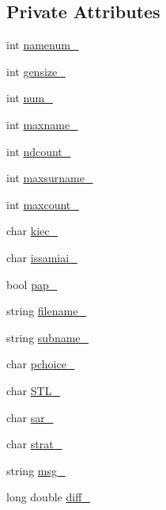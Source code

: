 \subsection*{Private Attributes}
\begin{DoxyCompactItemize}
\item 
int \mbox{\hyperlink{class_important_values_acd711f85f6a2871ae50aade637a51b2a}{namenum\+\_\+}}
\item 
int \mbox{\hyperlink{class_important_values_a49f72ee28d9dacb9d7bbf21271a01013}{gensize\+\_\+}}
\item 
int \mbox{\hyperlink{class_important_values_ae228106665e54c88007b1ff7284bcd40}{num\+\_\+}}
\item 
int \mbox{\hyperlink{class_important_values_ab7be93981115e171f8a37b15ec34fb08}{maxname\+\_\+}}
\item 
int \mbox{\hyperlink{class_important_values_ae86409afc0f217c84ec056c46ff3528e}{ndcount\+\_\+}}
\item 
int \mbox{\hyperlink{class_important_values_ad5e2235242b8c197dd8fd5dbf5c46b39}{maxsurname\+\_\+}}
\item 
int \mbox{\hyperlink{class_important_values_ae5892a115b336dc1defb0f62945f1bbb}{maxcount\+\_\+}}
\item 
char \mbox{\hyperlink{class_important_values_af1185fe18a6ffb86c4a7382f1f6749f4}{kiec\+\_\+}}
\item 
char \mbox{\hyperlink{class_important_values_a8b731b75de6085106d651d7450e65ae6}{issamiai\+\_\+}}
\item 
bool \mbox{\hyperlink{class_important_values_aedf041aae5dc23026b590f5eeb3f148a}{pap\+\_\+}}
\item 
string \mbox{\hyperlink{class_important_values_a178fdabdd685b94b2c2ff21e2ead73d5}{filename\+\_\+}}
\item 
string \mbox{\hyperlink{class_important_values_a993c7e0809f682a1172b11e04e5d35e8}{subname\+\_\+}}
\item 
char \mbox{\hyperlink{class_important_values_a0bcbd83830819fd57dc8481005985e59}{pchoice\+\_\+}}
\item 
char \mbox{\hyperlink{class_important_values_ab00a18c7c8945001071397bd63dc3f6e}{S\+T\+L\+\_\+}}
\item 
char \mbox{\hyperlink{class_important_values_a39167ad684faf8cb992bcd0efcb56d40}{sar\+\_\+}}
\item 
char \mbox{\hyperlink{class_important_values_a24afd1a2f042a2d1a3be517062751b8e}{strat\+\_\+}}
\item 
string \mbox{\hyperlink{class_important_values_a38d15d2a68315c20ae8fa1762123b236}{msg\+\_\+}}
\item 
long double \mbox{\hyperlink{class_important_values_a118816a87265a0602660dbbfbf2367d2}{diff\+\_\+}}
\end{DoxyCompactItemize}


